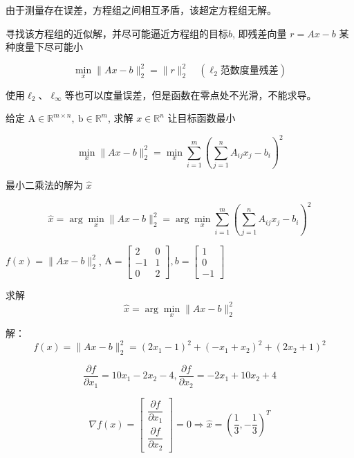 由于测量存在误差，方程组之间相互矛盾，该超定方程组无解。



\begin{problem}[最小二乘问题]
    寻找该方程组的近似解，并尽可能逼近方程组的目标$b$, 即残差向量 $ r=A x-b $ 某种度量下尽可能小

    $$ \min _{x}\|A x-b\|_{2}^{2}=\|r\|_{2}^{2} \quad (\ell_2范数度量残差) $$
\end{problem}


使用$\ell_2$、$\ell_\infty$等也可以度量误差，但是函数在零点处不光滑，不能求导。

\begin{problem}[求解最小二乘解]
    给定 $ \mathrm{A} \in \mathbb{R}^{m \times n}, \mathrm{~b} \in \mathbb{R}^{m} $, 求解 $ x \in \mathbb{R}^{n} $ 让目标函数最小

$$ \min _{x}\|A x-b\|_{2}^{2}=\min _{x} \sum_{i=1}^{m}\left(\sum_{j=1}^{n} A_{i j} x_{j}-b_{i}\right)^{2} $$
\end{problem}

\begin{notation}[最小二乘法的解]
    最小二乘法的解为 $ \hat{x} $

    $$
    \hat{x}=\arg \underset{x}{\min}\|A x-b\|_{2}^{2}=\arg \underset{x}{\min} \sum_{i=1}^{m}\left(\sum_{j=1}^{n} A_{i j} x_{j}-b_{i}\right)^{2}
    $$
\end{notation}

\begin{example}
    $ f(x)=\|A x-b\|_{2}^{2} $, $ \mathrm{A}=\left[\begin{array}{cc}2 & 0 \\ -1 & 1 \\ 0 & 2\end{array}\right], b=\left[\begin{array}{c}1 \\ 0 \\ -1\end{array}\right] $

    求解$$\hat{x} = \arg \underset{x}{\min} \|A x-b\|_{2}^{2}$$

    解：
    $$ f(x)=\|A x-b\|_{2}^{2}=\left(2 x_{1}-1\right)^{2}+\left(-x_{1}+x_{2}\right)^{2}+\left(2 x_{2}+1\right)^{2} $$

    $$ \frac{\partial f}{\partial x_{1}}=10 x_{1}-2 x_{2}-4 , \frac{\partial f}{\partial x_{2}}=-2 x_{1}+10 x_{2}+4 $$

    $$ \nabla f(x)=\left[\begin{array}{l}\dfrac{\partial f}{\partial x_{1}} \\ \dfrac{\partial f}{\partial x_{2}}\end{array}\right]=0 \Rightarrow \hat{x}=\left(\frac{1}{3},-\frac{1}{3}\right)^{T} $$
\end{example}


